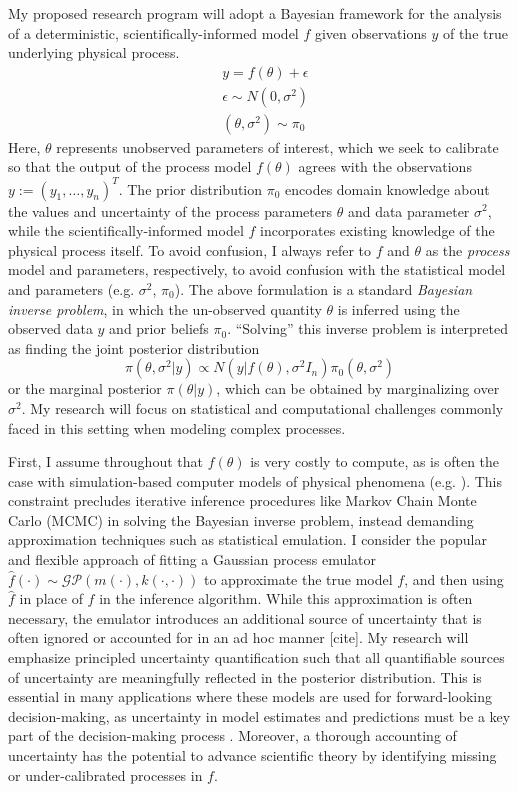\documentclass[12pt]{article}
\begin{document}
My proposed research program will adopt a Bayesian framework for the analysis of a deterministic, scientifically-informed model $f$ given observations $y$ of the true underlying physical process.
\begin{align*}
&y = f(\theta) + \epsilon \\
&\epsilon \sim N(0, \sigma^2) \\
&(\theta, \sigma^2) \sim \pi_0
\end{align*}
Here, $\theta$ represents unobserved parameters of interest, which we seek to calibrate so that the output of the process model $f(\theta)$ agrees with the observations 
$y := (y_1, \dots, y_n)^T$. 
The prior distribution $\pi_0$ encodes domain knowledge about the values and uncertainty of the process parameters $\theta$ and data parameter $\sigma^2$, 
while the scientifically-informed model $f$ incorporates existing knowledge of the physical process itself. To avoid confusion, I always refer to $f$ and $\theta$ as the 
\textit{process} model and parameters, respectively, to avoid confusion with the statistical model and parameters (e.g. $\sigma^2$, $\pi_0$). 
The above formulation is a standard \textit{Bayesian inverse problem}, in which the un-observed quantity $\theta$ is inferred using the observed data $y$ and prior 
beliefs $\pi_0$. ``Solving'' this inverse problem is interpreted as finding the joint posterior distribution
\[\pi(\theta, \sigma^2|y) \propto N(y|f(\theta), \sigma^2 I_n)\pi_0(\theta, \sigma^2)\]
or the marginal posterior $\pi(\theta|y)$, which can be obtained by marginalizing over $\sigma^2$. My research will focus on statistical and computational challenges 
commonly faced in this setting when modeling complex processes.

First, I assume throughout that $f(\theta)$ is very costly to compute, as is often the case with simulation-based computer models of physical phenomena (e.g. \cite{Fer}). 
This constraint precludes iterative inference procedures like Markov Chain Monte Carlo (MCMC) in solving the Bayesian inverse problem, instead demanding 
approximation techniques such as statistical emulation. I consider the popular and flexible approach of fitting a Gaussian process emulator 
$\hat{f}(\cdot) \sim \mathcal{GP}(m(\cdot), k(\cdot, \cdot))$ to approximate the true model $f$, and then using $\hat{f}$ in place of $f$ in the inference algorithm.
 While this approximation is often necessary, the emulator introduces an additional source of uncertainty that is often ignored or accounted for in an ad hoc manner [cite]. My research will emphasize
 principled uncertainty quantification such that all quantifiable sources of uncertainty are meaningfully reflected in the posterior distribution. This is essential in many applications
 where these models are used for forward-looking decision-making, as uncertainty in model estimates and predictions must be a key part of the decision-making process \cite{Dietze}.
 Moreover, a thorough accounting of uncertainty has the potential to advance scientific theory by identifying missing or under-calibrated processes in $f$. 
 
\end{document}
